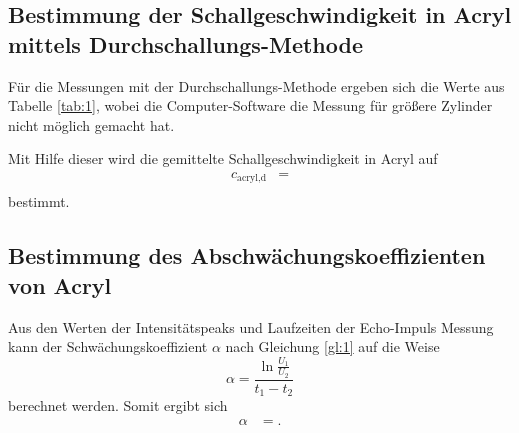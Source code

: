 \subsection{Bestimmung der Schallgeschwindigkeit in Acryl mittels Durchschallungs-Methode}
Für die Messungen mit der Durchschallungs-Methode ergeben sich die Werte aus Tabelle \ref{tab:1}, wobei die Computer-Software die Messung für größere Zylinder nicht möglich gemacht hat.
  
Mit Hilfe dieser wird die gemittelte Schallgeschwindigkeit in Acryl auf
\begin{align*}
  c_{\text{acryl,d}} &= \\
\end{align*}
bestimmt.

\subsection{Bestimmung des Abschwächungskoeffizienten von Acryl}
Aus den Werten der Intensitätspeaks und Laufzeiten der Echo-Impuls Messung kann der Schwächungskoeffizient $\alpha$ nach Gleichung \ref{gl:1} auf die Weise
\begin{equation}
  \alpha = \frac{\ln{\frac{U_1}{U_2}}}{t_1-t_2}
\end{equation}
berechnet werden.
Somit ergibt sich
\begin{align*}
  \alpha &= .\\
\end{align*}
